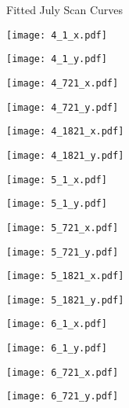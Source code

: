\documentclass[8pt]{beamer}
\begin{document}
\begin{frame}
\centering
\large{Fitted July Scan Curves}
\end{frame}
\begin{frame}
\center
\texttt{[image: 4\_1\_x.pdf]}
\end{frame}
\begin{frame}
\center
\texttt{[image: 4\_1\_y.pdf]}
\end{frame}
\begin{frame}
\center
\texttt{[image: 4\_721\_x.pdf]}
\end{frame}
\begin{frame}
\center
\texttt{[image: 4\_721\_y.pdf]}
\end{frame}
\begin{frame}
\center
\texttt{[image: 4\_1821\_x.pdf]}
\end{frame}
\begin{frame}
\center
\texttt{[image: 4\_1821\_y.pdf]}
\end{frame}
\begin{frame}
\center
\texttt{[image: 5\_1\_x.pdf]}
\end{frame}
\begin{frame}
\center
\texttt{[image: 5\_1\_y.pdf]}
\end{frame}
\begin{frame}
\center
\texttt{[image: 5\_721\_x.pdf]}
\end{frame}
\begin{frame}
\center
\texttt{[image: 5\_721\_y.pdf]}
\end{frame}
\begin{frame}
\center
\texttt{[image: 5\_1821\_x.pdf]}
\end{frame}
\begin{frame}
\center
\texttt{[image: 5\_1821\_y.pdf]}
\end{frame}
\begin{frame}
\center
\texttt{[image: 6\_1\_x.pdf]}
\end{frame}
\begin{frame}
\center
\texttt{[image: 6\_1\_y.pdf]}
\end{frame}
\begin{frame}
\center
\texttt{[image: 6\_721\_x.pdf]}
\end{frame}
\begin{frame}
\center
\texttt{[image: 6\_721\_y.pdf]}
\end{frame}
\end{document}
